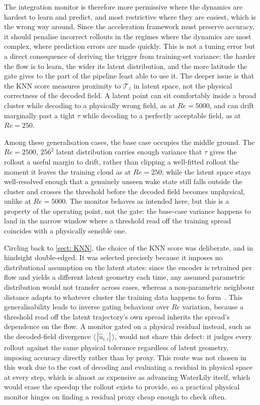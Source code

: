 The integration monitor is therefore more permissive where the dynamics are hardest to learn and predict, and most restrictive where they are easiest, which is the wrong way around. Since the acceleration framework must preserve accuracy, it should penalise incorrect rollouts in the regimes where the dynamics are most complex, where prediction errors are made quickly. This is not a tuning error but a direct consequence of deriving the trigger from training-set variance: the harder the flow is to learn, the wider its latent distribution, and the more latitude the gate gives to the part of the pipeline least able to use it. The deeper issue is that the KNN score measures proximity to $\boldsymbol{\mathcal{T}}_z$ in latent space, not the physical correctness of the decoded field. A latent point can sit comfortably inside a broad cluster while decoding to a physically wrong field, as at $Re=5000$, and can drift marginally past a tight $\tau$ while decoding to a perfectly acceptable field, as at $Re=250$.


Among these generalisation cases, the base case occupies the middle ground. The $Re=2500$, $256^2$ latent distribution carries enough variance that $\tau$ gives the rollout a useful margin to drift, rather than clipping a well-fitted rollout the moment it leaves the training cloud as at $Re=250$; while the latent space stays well-resolved enough that a genuinely unseen wake state still falls outside the cluster and crosses the threshold before the decoded field becomes unphysical, unlike at $Re=5000$. The monitor behaves as intended here, but this is a property of the operating point, not the gate: the base-case variance happens to land in the narrow window where a threshold read off the training spread coincides with a physically sensible one.

Circling back to \ref{sect: KNN}, the choice of the KNN score was deliberate, and in hindsight double-edged. It was selected precisely because it imposes no distributional assumption on the latent states: since the encoder is retrained per flow and yields a different latent geometry each time, any assumed parametric distribution would not transfer across cases, whereas a non-parametric neighbour distance adapts to whatever cluster the training data happens to form~\cite{Sun2022}. This generalisability leads to inverse gating behaviour over $Re$ variation, because a threshold read off the latent trajectory's own spread inherits the spread's dependence on the flow. A monitor gated on a physical residual instead, such as the decoded-field divergence $\langle\,|\hat{u}_{i,i}|\,\rangle$, would not share this defect: it judges every rollout against the same physical tolerance regardless of latent geometry, imposing accuracy directly rather than by proxy. This route was not chosen in this work due to the cost of decoding and evaluating a residual in physical space at every step, which is almost as expensive as advancing WaterLily itself, which would erase the speedup the rollout exists to provide, so a practical physical monitor hinges on finding a residual proxy cheap enough to check often.


